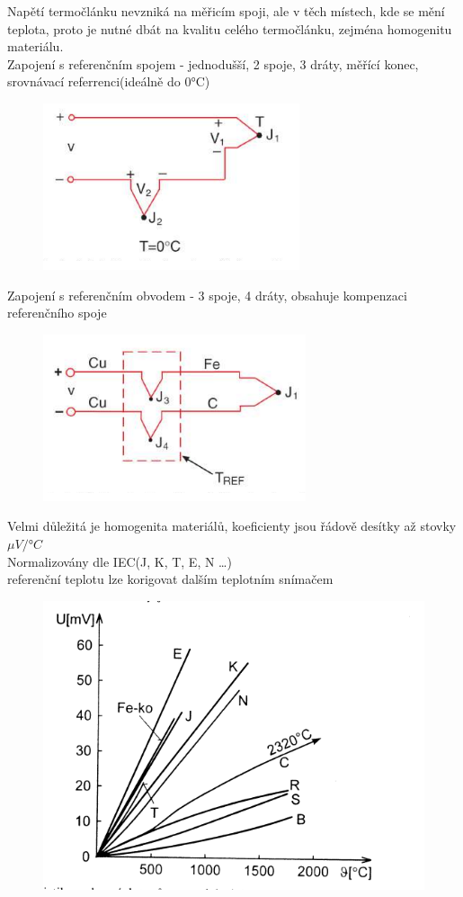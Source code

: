 Napětí termočlánku nevzniká na měřicím spoji, ale v těch místech, kde se mění teplota, proto je nutné dbát na kvalitu celého termočlánku, zejména homogenitu materiálu.\\
Zapojení s referenčním spojem - jednodušší, 2 spoje, 3 dráty, měřící konec, srovnávací referrenci(ideálně do 0°C)
\begin{figure}[H]
    \includegraphics*[scale = 1.2]{img/termoclanek_2spoje.png}
\end{figure}
\newpage
Zapojení s referenčním obvodem - 3 spoje, 4 dráty, obsahuje kompenzaci referenčního spoje
\begin{figure}[H]
    \includegraphics*[scale = 1.2]{img/termoclanek_3spoje.png}
\end{figure}

Velmi důležitá je homogenita materiálů, koeficienty jsou řádově desítky až stovky $\mu V/ °C$\\
Normalizovány dle IEC(J, K, T, E, N \dots )\\
referenční teplotu lze korigovat dalším teplotním snímačem\\
\begin{figure}[H]
    \includegraphics*[scale = 0.9]{img/termoclanek_graf.png}
\end{figure}


